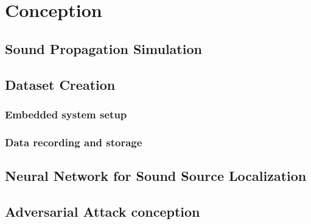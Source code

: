 \chapter{Conception}
\label{ch:methodology}

\section{Sound Propagation Simulation}

\section{Dataset Creation}

\subsection{Embedded system setup}

\subsection{Data recording and storage}

\section{Neural Network for Sound Source Localization}

\section{Adversarial Attack conception}